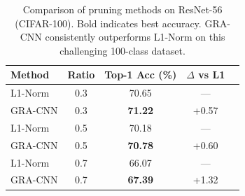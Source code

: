 \begin{table}[ht]
\centering
\caption{Comparison of pruning methods on ResNet-56 (CIFAR-100). Bold indicates best accuracy. GRA-CNN consistently outperforms L1-Norm on this challenging 100-class dataset.}
\label{tab:cifar100_r56}
\begin{tabular}{lcccc}
\toprule
Method & Ratio & Top-1 Acc (\%) & $\Delta$ vs L1 \\
\midrule
L1-Norm & 0.3 & 70.65 & --- \\
GRA-CNN & 0.3 & \textbf{71.22} & +0.57 \\
\midrule
L1-Norm & 0.5 & 70.18 & --- \\
GRA-CNN & 0.5 & \textbf{70.78} & +0.60 \\
\midrule
L1-Norm & 0.7 & 66.07 & --- \\
GRA-CNN & 0.7 & \textbf{67.39} & +1.32 \\
\bottomrule
\end{tabular}
\end{table}
